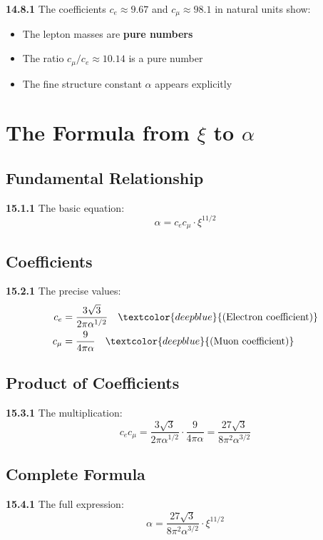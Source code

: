 \noindent \textbf{14.8.1} The coefficients $c_e \approx 9.67$ and $c_\mu \approx 98.1$ in natural units show:

\begin{itemize}
	\item The lepton masses are \textbf{pure numbers}
	\item The ratio $c_\mu/c_e \approx 10.14$ is a pure number
	\item The fine structure constant $\alpha$ appears explicitly
\end{itemize}

\section{The Formula from $\xi$ to $\alpha$}

\subsection{Fundamental Relationship}

\noindent \textbf{15.1.1} The basic equation:
\[
\boxed{\alpha = c_e c_\mu \cdot \xi^{11/2}}
\]

\subsection{Coefficients}

\noindent \textbf{15.2.1} The precise values:
\begin{align*}
	c_e &= \frac{3\sqrt{3}}{2\pi\alpha^{1/2}} \quad \textcolor{deepblue}{\text{(Electron coefficient)}} \\
	c_\mu &= \frac{9}{4\pi\alpha} \quad \textcolor{deepblue}{\text{(Muon coefficient)}}
\end{align*}

\subsection{Product of Coefficients}

\noindent \textbf{15.3.1} The multiplication:
\[
c_e c_\mu = \frac{3\sqrt{3}}{2\pi\alpha^{1/2}} \cdot \frac{9}{4\pi\alpha} = \frac{27\sqrt{3}}{8\pi^2\alpha^{3/2}}
\]

\subsection{Complete Formula}

\noindent \textbf{15.4.1} The full expression:
\[
\alpha = \frac{27\sqrt{3}}{8\pi^2\alpha^{3/2}} \cdot \xi^{11/2}
\]

